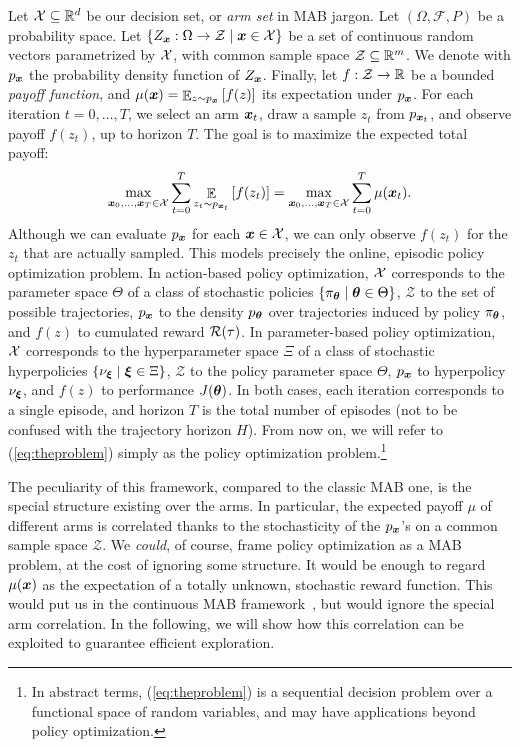 \documentclass{article}
\begin{document}
Let $\mathcal{X}\subseteq \mathbb{R}^d$ be our decision set, or \textit{arm set} in MAB jargon. Let $(\Omega,\mathcal{F},P)$ be a probability space. Let ${\{Z_{\boldsymbol{x}}:\Omega\to\mathcal{Z}\mid \boldsymbol{x}\in\mathcal{X}\}}$ be a set of continuous random vectors parametrized by $\mathcal{X}$, with common sample space ${\mathcal{Z}\subseteq \mathbb{R}^m}$. We denote with $p_{\boldsymbol{x}}$ the probability density function of $Z_{\boldsymbol{x}}$. Finally, let $f:\mathcal{Z}\to\mathbb{R}$ be a bounded \textit{payoff function}, and $\mu(\boldsymbol{x}) = \mathop{\mathbb{E}}_{z\sim p_{\boldsymbol{x}}}\left[f(z)\right]$ its expectation under $p_{\boldsymbol{x}}$. For each iteration $t=0,\dots,T$, we select an arm $\boldsymbol{x}_t$, draw a sample $z_t$ from $p_{\boldsymbol{x}_t}$, and observe payoff $f(z_t)$, up to horizon $T$. The goal is to maximize the expected total payoff:
\begin{align}\label{eq:theproblem}
\max_{\boldsymbol{x}_0,\dots,\boldsymbol{x}_T\in\mathcal{X}} \sum_{t=0}^T \mathop{\mathbb{E}}_{z_t\sim p_{\boldsymbol{x}_t}}\left[ f(z_t)\right] = \max_{\boldsymbol{x}_0,\dots,\boldsymbol{x}_T\in\mathcal{X}}\sum_{t=0}^{T}\mu(\boldsymbol{x}_t).
\end{align}
Although we can evaluate $p_{\boldsymbol{x}}$ for each $\boldsymbol{x}\in\mathcal{X}$, we can only observe $f(z_t)$ for the $z_t$ that are actually sampled. 
This models precisely the online, episodic policy optimization problem.
In action-based policy optimization, $\mathcal{X}$ corresponds to the parameter space $\Theta$ of a class of stochastic policies ${\{\pi_{\boldsymbol{\theta}}\mid\boldsymbol{\theta}\in\Theta\}}$, $\mathcal{Z}$ to the set of possible trajectories, $p_{\boldsymbol{x}}$ to the density $p_{\boldsymbol{\theta}}$ over trajectories induced by policy $\pi_{\boldsymbol{\theta}}$, and $f(z)$ to cumulated reward $\mathcal{R}(\tau)$. 
In parameter-based policy optimization, $\mathcal{X}$ corresponds to the hyperparameter space $\Xi$ of a class of stochastic hyperpolicies $\{\nu_{\boldsymbol{\xi}}\mid\boldsymbol{\xi}\in\Xi\}$, $\mathcal{Z}$ to the policy parameter space $\Theta$, $p_{\boldsymbol{x}}$ to hyperpolicy $\nu_{\boldsymbol{\xi}}$, and $f(z)$ to performance $J(\boldsymbol{\theta})$. In both cases, each iteration corresponds to a single episode, and horizon $T$ is the total number of episodes (not to be confused with the trajectory horizon $H$). From now on, we will refer to (\ref{eq:theproblem}) simply as the policy optimization problem.\footnote{ In abstract terms, (\ref{eq:theproblem}) is a sequential decision problem over a functional space of random variables, and may have applications beyond policy optimization.}

The peculiarity of this framework, compared to the classic MAB one, is the special structure existing over the arms. In particular, the expected payoff $\mu$ of different arms is correlated thanks to the stochasticity of the $p_{\boldsymbol{x}}$'s on a common sample space $\mathcal{Z}$.
We \textit{could}, of course, frame policy optimization as a MAB problem, at the cost of ignoring some structure. It would be enough to regard $\mu(\boldsymbol{x})$ as the expectation of a totally unknown, stochastic reward function. This would put us in the continuous MAB framework~\citep{kleinberg2013bandits}, but would ignore the special arm correlation. In the following, we will show how this correlation can be exploited to guarantee efficient exploration.
\end{document}
